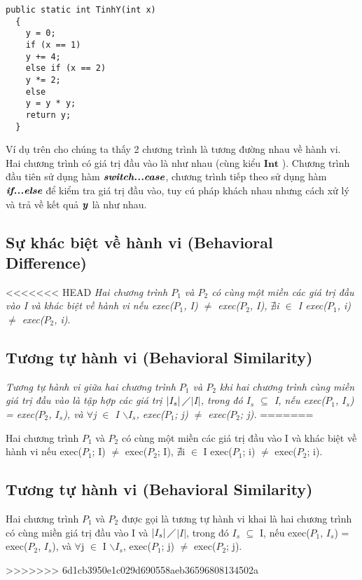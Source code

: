 \begin{lstlisting}[language={[Sharp]C}, caption={Tính y, sử dụng hàm If...else}, label={Script}]
  public static int TinhY(int x)
  {
    y = 0;
    if (x == 1)
    y += 4;
    else if (x == 2)
    y *= 2;
    else
    y = y * y;
    return y;
  }
\end{lstlisting}

Ví dụ trên cho chúng ta thấy 2 chương trình là tương đường nhau về
hành vi. Hai chương trình có giá trị đầu vào là như nhau (cùng kiểu
$\textbf{Int}$ ). Chương trình đầu tiên sử dụng hàm
$\textit{\textbf{switch...case}}$, chương trình tiếp theo sử dụng hàm
$\textit{\textbf{if...else}}$ để kiểm tra giá trị đầu vào, tuy cú pháp
khách nhau nhưng cách xử lý và trả về kết quả $\textbf{\textit{y}}$ là
như nhau.
	
\subsection{Sự khác biệt về hành vi (Behavioral Difference)}
<<<<<<< HEAD
	\textit{Hai chương trình $P_{1}$ và $P_{2}$ có cùng một miền các giá trị đầu vào I và khác biệt về hành vi nếu exec($P_{1}$, I) $\neq$ exec($P_{2}$, I), $\nexists$i $\in$ I exec($P_{1}$, i) $\neq$ exec($P_{2}$, i)}.
	
\subsection{Tương tự hành vi (Behavioral Similarity)}
	\textit{Tương tự hành vi giữa hai chương trình $P_{1}$ và $P_{2}$ khi hai chương trình cùng miền giá trị đầu vào là tập hợp các giá trị $\left|I_{s}\right|\diagup$$\left|I\right|$, trong đó $I_{s}$ $\subseteq $ I, nếu exec($P_{1}$, $I_{s}$) = exec($P_{2}$, $I_{s}$), và $\forall$j $\in$ I $\backslash$$I_{s}$, exec($P_{1}$; j) $\neq$ exec($P_{2}$; j).}
=======

\begin{definition}
  Hai chương trình $P_{1}$ và $P_{2}$ có cùng một miền các giá trị đầu
  vào I và khác biệt về hành vi nếu exec($P_{1}$; I) $\neq$
  exec($P_{2}$; I), $\nexists$i $\in$ I exec($P_{1}$; i) $\neq$
  exec($P_{2}$; i).
\end{definition}

	
\subsection{Tương tự hành vi (Behavioral Similarity)}

\begin{definition}
  Hai chương trình $P_{1}$ và $P_{2}$ được gọi là tương tự hành vi
  khai là hai chương trình có cùng miền giá trị đầu vào I và
  $\left|I_{s}\right|\diagup$$\left|I\right|$, trong đó
  $I_{s}$ $\subseteq $ I, nếu exec($P_{1}$, $I_{s}$) =
  exec($P_{2}$, $I_{s}$), và $\forall$j $\in$ I
  $\backslash$$I_{s}$, exec($P_{1}$; j) $\neq$ exec($P_{2}$; j).
\end{definition}
>>>>>>> 6d1cb3950e1c029d690558aeb36596808134502a





